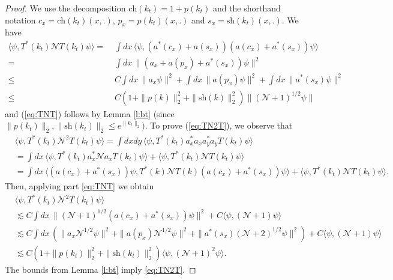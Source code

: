 \documentclass[11pt,a4paper,DIV11]{scrartcl}	%
\newcommand{\N}{\mathcal{N}}
\begin{document}
\begin{proof}
We use the decomposition $\text{ch} (k_t) = 1 + p(k_t)$ and the shorthand notation $c_x = \text{ch} (k_t) (x,.)$, $p_x = p(k_t) (x,.)$ and $s_x = \text{sh} (k_t) (x,.)$. We have
 \[\begin{split} 
  \langle \psi, T^* (k_t)  \N T (k_t) \psi \rangle = \; & \int dx \, \langle  \psi, (a^* (c_x) + a (s_x)) (a (c_x) + a^* (s_x)) \psi \rangle \\ = \; &\int dx \, \| (a_x + a(p_x) + a^*(s_x)) \psi
  \|^2 \\  \leq \; &C  \int dx \, \| a_x \psi \|^2
    + \int dx \, \| a(p_x) \psi \|^2 + \int dx \, \| a^*(s_x) \psi \|^2 \\
    \leq \; &C ( 1 + \| p (k) \|_2^2 + \| \text{sh} (k) \|_2^2 ) \| (\N + 1)^{1/2}  \psi \| 
      \end{split}\]
and (\ref{eq:TNT}) follows by Lemma \ref{l:bt} (since $\| p (k_t) \|_2, \| \text{sh} (k_t) \|_2 \leq e^{\| k_t \|_2})$. To prove (\ref{eq:TN2T}), we observe that 
\begin{align*}
 & \langle \psi, T^* (k_t) \N^2 T (k_t) \psi \rangle = \int dxdy \, \langle \psi, T^* (k_t)  a_x^* a_x a_y^* a_y T (k_t) \psi \rangle \\
    & = \int dx \, \langle \psi, T^* (k_t)  a_x^* \N a_x T (k_t) \psi \rangle + \langle
    \psi, T^* (k_t)  \N T (k_t) \psi \rangle \\
    & = \int dx \, \langle (a(c_x) + a^*(s_x)) \psi, T^* (k)  \N T (k) (a (c_x)  + a^*(s_x)) \psi \rangle + \langle \psi, T^* (k_t) \N T (k_t) \psi \rangle.
  \end{align*}
  Then, applying part \eqref{eq:TNT}  we obtain
  \begin{align*}
    & \langle \psi, T^* (k_t) \N^2 T (k_t) \psi \rangle \\
    & \apprle C \int dx \, \| (\N+1)^{1/2} (a (c_x) +
    a^*(s_x)) \psi \|^2 + C \langle \psi, (\N+1) \psi \rangle \\
    & \apprle C \int dx \, (\| a_x \N^{1/2} \psi \|^2 + \| a(p_x)
    \N^{1/2} \psi \|^2 + \| a^*(s_x) (\N+2)^{1/2} \psi \|^2 ) + C \langle
    \psi, (\N+1) \psi \rangle \\
    & \apprle C(1 + \| p (k_t) \|_{2}^2 + \| \text{sh} (k_t)  \|_{2}^2) \langle \psi, (\N+1)^2
    \psi \rangle.
  \end{align*}
The bounds from Lemma \ref{l:bt} imply \eqref{eq:TN2T}.
\end{proof}
\end{document}
